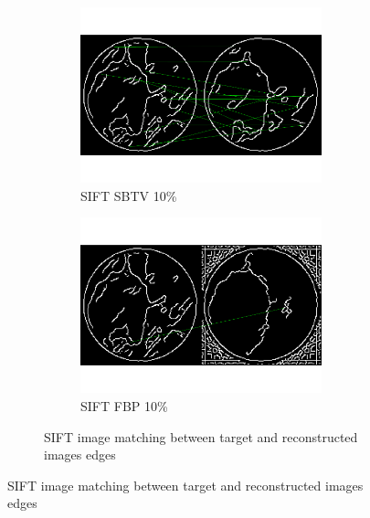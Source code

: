 \documentclass[10pt,a4paper,titlepage]{article}
\begin{document}
\begin{figure}
\begin{figure}[H]
			\begin{subfigure}[b]{0.475\textwidth}
				\includegraphics[width=\textwidth]{Sample1/SIFT/Edges/SB/10p.png}
				\caption{SIFT SBTV 10\%}
			\end{subfigure}
			\begin{subfigure}[b]{0.475\textwidth}
				\includegraphics[width=\textwidth]{Sample1/SIFT/Edges/FBP/10p.png}
				\caption{SIFT FBP 10\%}
			\end{subfigure}
			\caption{SIFT image matching between target and reconstructed images edges}
			\label{fig:SIFTedges}
		\end{figure}
\end{figure}
\clearpage
\end{document}
